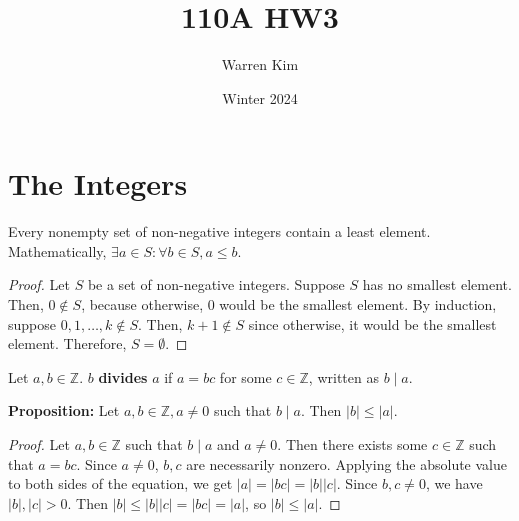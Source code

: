 \documentclass [12pt] {article}
\title{110A HW3}
\author{Warren Kim}
\date{Winter 2024}
\newcommand{\Z}{\mathbb{Z}}
\newenvironment{definition}[1]{\begin{tcolorbox}[title={Definition: #1},colback=blue!5!white,colframe=black!75!blue]}{\end{tcolorbox}}
\newenvironment{theorem}[1]{\begin{tcolorbox}[title={Theorem #1},colback=green!5!white,colframe=black!75!green]}{\end{tcolorbox}}
\renewcommand{\bf}[1]{\textbf{{#1}}}
\begin{document}
\tableofcontents
\newpage

\section{The Integers}
\begin{theorem}{(Well-Ordering Principle)}
Every nonempty set of non-negative integers contain a least element. Mathematically,
$\exists a \in S : \forall b \in S, a \leq b$.
\end{theorem}
\begin{proof}
    Let $S$ be a set of non-negative integers. Suppose $S$ has no smallest element. Then,
    $0 \not \in S$, because otherwise, $0$ would be the smallest element. By induction, suppose
    $0, 1, \ldots, k \not \in S$. Then, $k + 1 \not \in S$ since otherwise, it would be the smallest
    element. Therefore, $S = \emptyset$.
\end{proof}

\begin{definition}{Divides}
    Let $a, b \in \Z$. $b$ \bf{divides} $a$ if $a = bc$ for some $c \in \Z$, written as $b \mid a$.
\end{definition}
\bf{Proposition:} Let $a, b \in \Z, a \neq 0$ such that $b \mid a$. Then $|b| \leq |a|$.
\begin{proof}
    Let $a, b \in \Z$ such that $b \mid a$ and $a \neq 0$. Then there exists some $c \in \Z$ such that
    $a = bc$. Since $a \neq 0$, $b, c$ are necessarily nonzero. Applying the absolute value to both
    sides of the equation, we get $|a| = |bc| = |b||c|$. Since $b, c \neq 0$, we have $|b|, |c| > 0$.
    Then $|b| \leq |b||c| = |bc| = |a|$, so $|b| \leq |a|$.
\end{proof}
\end{document}
